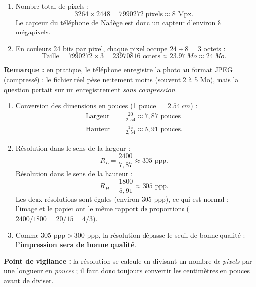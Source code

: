 \documentclass[11pt]{article}
\begin{document}
\begin{corrige}
\begin{enumerate}
\item Nombre total de pixels :
\[ 3264 \times 2448 = \num{7990272} \text{ pixels} \approx 8 \text{ Mpx.} \]
Le capteur du téléphone de Nadège est donc un capteur d'environ 8 mégapixels.
\item En couleurs 24 bits par pixel, chaque pixel occupe $24 \div 8 = 3$ octets :
\[ \text{Taille} = \num{7990272} \times 3 = \num{23970816} \text{ octets} \approx \SI{23,97}{Mo} \approx \SI{24}{Mo}. \]
\end{enumerate}
\textbf{Remarque :} en pratique, le téléphone enregistre la photo au format JPEG (compressé) : le fichier réel pèse nettement moins (souvent 2 à 5 Mo), mais la question portait sur un enregistrement \emph{sans compression}.
\end{corrige}

\begin{corrige}
\begin{enumerate}
\item Conversion des dimensions en pouces (1 pouce $= \SI{2,54}{cm}$) :
\begin{align*}
\text{Largeur} &= \frac{20}{2,54} \approx 7,87 \text{ pouces} \\
\text{Hauteur} &= \frac{15}{2,54} \approx 5,91 \text{ pouces.}
\end{align*}
\item Résolution dans le sens de la largeur :
\[ R_L = \frac{2400}{7,87} \approx 305 \text{ ppp.} \]
Résolution dans le sens de la hauteur :
\[ R_H = \frac{1800}{5,91} \approx 305 \text{ ppp.} \]
Les deux résolutions sont égales (environ 305 ppp), ce qui est normal : l'image et le papier ont le même rapport de proportions ($2400/1800 = 20/15 = 4/3$).
\item Comme $305 \text{ ppp} > 300 \text{ ppp}$, la résolution dépasse le seuil de bonne qualité : \textbf{l'impression sera de bonne qualité}.
\end{enumerate}
\textbf{Point de vigilance :} la résolution se calcule en divisant un nombre de \emph{pixels} par une longueur en \emph{pouces} ; il faut donc toujours convertir les centimètres en pouces avant de diviser.
\end{corrige}
\end{document}
